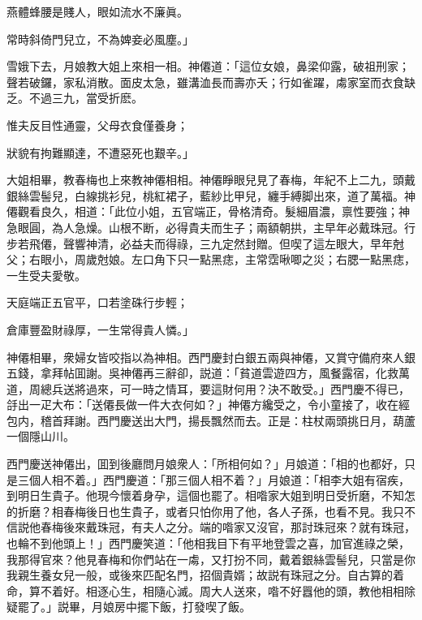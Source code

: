 \begin{myquote}
燕體蜂腰是賤人，眼如流水不廉眞。

常時斜倚門兒立，不為婢妾必風塵。」
\end{myquote}

雪娥下去，月娘教大姐上來相一相。神僊道：「這位女娘，鼻梁仰露，破祖刑家；聲若破鑼，家私消散。面皮太急，雖溝洫長而壽亦夭；行如雀躍，䖏家室而衣食缺乏。不過三九，當受折麽。

\begin{myquote}
惟夫反目性通靈，父母衣食僅養身；

狀貌有拘難顯達，不遭惡死也艱辛。」
\end{myquote}

大姐相畢，教春梅也上來教神僊相相。神僊睜眼兒見了春梅，年紀不上二九，頭戴銀絲雲髻兒，白線挑衫兒，桃紅裙子，藍紗比甲兒，纏手縛脚出來，道了萬福。神僊觀看良久，相道：「此位小姐，五官端正，骨格清奇。髮細眉濃，禀性要強；神急眼圓，為人急燥。山根不断，必得貴夫而生子；兩額朝拱，主早年必戴珠冠。行步若飛僊，聲響神清，必益夫而得祿，三九定然封贈。但喫了這左眼大，早年尅父；右眼小，周歲尅娘。左口角下只一點黑痣，主常霑啾唧之災；右腮一點黑痣，一生受夫愛敬。

\begin{myquote}
天庭端正五官平，口若塗硃行步輕；

倉庫豐盈財祿厚，一生常得貴人憐。」
\end{myquote}

神僊相畢，衆婦女皆咬指以為神相。西門慶封白銀五兩與神僊，又賞守備府來人銀五錢，拿拜帖囬謝。吳神僊再三辭卻，説道：「貧道雲遊四方，風餐露宿，化救萬道，周總兵送將過來，可一時之情耳，要這財何用？決不敢受。」西門慶不得已，㧱出一疋大布：「送僊長做一件大衣何如？」神僊方纔受之，令小童接了，收在經包内，稽首拜謝。西門慶送出大門，揚長飄然而去。正是：柱杖兩頭挑日月，葫蘆一個隱山川。

西門慶送神僊出，囬到後廳問月娘衆人：「所相何如？」月娘道：「相的也都好，只是三個人相不着。」西門慶道：「那三個人相不着？」月娘道：「相李大姐有宿疾，到明日生貴子。他現今懷着身孕，這個也罷了。相喒家大姐到明日受折磨，不知怎的折磨？相春梅後日也生貴子，或者只怕你用了他，各人子孫，也看不見。我只不信説他春梅後來戴珠冠，有夫人之分。端的喒家又沒官，那討珠冠來？就有珠冠，也輪不到他頭上！」西門慶笑道：「他相我目下有平地登雲之喜，加官進祿之榮，我那得官來？他見春梅和你們站在一䖏，又打扮不同，戴着銀絲雲髻兒，只當是你我親生養女兒一般，或後來匹配名門，招個貴婿；故説有珠冠之分。自古算的着命，算不着好。相逐心生，相隨心滅。周大人送來，喒不好囂他的頭，教他相相除疑罷了。」説畢，月娘房中擺下飯，打發喫了飯。

